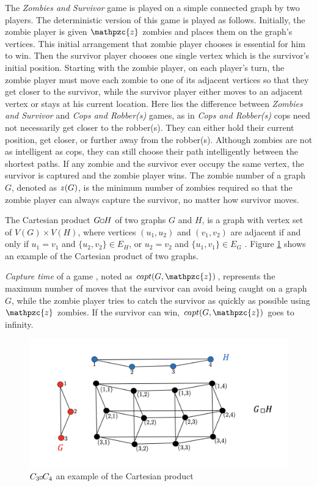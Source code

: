 \documentclass[1p]{elsarticle}
\newcommand{\zn}{\ooalign{$z$\cr\hfil\rule[.5ex]{.2em}{.08ex}\hfil\cr}}
\newcommand{\sq}[1][black]{%
\begin{tikzpicture}                                                           
  \draw[#1] (2pt,0pt) -- (6pt,0pt);   
  \draw[#1] (2pt,0pt) -- (2pt,4pt);    
  \draw[#1] (2pt,4pt) -- (6pt,4pt);   
  \draw[#1] (6pt,0pt) -- (6pt,4pt);
\end{tikzpicture}%
}
\newcommand{\sqSmall}[1][black]{%
\begin{tikzpicture}                                                           
  \draw[#1] (1.5pt,0pt) -- (4.5pt,0pt);   
  \draw[#1] (1.5pt,0pt) -- (1.5pt,3pt);    
  \draw[#1] (1.5pt,3pt) -- (4.5pt,3pt);   
  \draw[#1] (4.5pt,0pt) -- (4.5pt,3pt);
\end{tikzpicture}%
}
\begin{document}
The {\it Zombies and Survivor} game is played on a simple connected graph by two players. The deterministic version of
this game \cite{Fitz16} is played as follows. Initially, the zombie player is given $\mathpzc{z}$ zombies and places
them on the graph's vertices. This initial arrangement that zombie player chooses is essential for him to win.  Then the
survivor player chooses one single vertex which is the survivor's initial position. Starting with the zombie player, on
each player's turn, the zombie player must move each zombie to one of its adjacent vertices so that they get closer to
the survivor, while the survivor player either moves to an adjacent vertex or stays at his current location. Here lies
the difference between {\it Zombies and Survivor} and {\it Cops and Robber(s)} games, as in {\it Cops and Robber(s)}
cops need not necessarily get closer to the robber(s). They can either hold their current position, get closer, or
further away from the robber(s). Although zombies are not as intelligent as cops, they can still choose their path
intelligently between the shortest paths. If any zombie and the survivor ever occupy the same vertex, the survivor is
captured and the zombie player wins. The zombie number of a graph $G$, denoted as $\zn(G)$, is the minimum number of
zombies required so that the zombie player can always capture the survivor, no matter how survivor moves.

The Cartesian product $G \sq H$ of two graphs $G$ and $H$, is a graph with vertex set of $V(G) \times V(H)$, where
vertices $(u_1 , u_2)$ and $(v_1 , v_2)$ are adjacent if and only if $u_1 = v_1$ and $ \{ u_2 , v_2 \} \in E_{H} $, or
$u_2 = v_2$ and $ \{u_1 , v_1 \} \in E_{G}$ \cite{West02}. Figure \ref{fig:p2} shows an example of the Cartesian product
of two graphs.

{\it Capture time} of a game \cite{Bonato09}, noted as $capt(G,\mathpzc{z})$, represents the maximum number of moves
that the survivor can avoid being caught on a graph $G$, while the zombie player tries to catch the survivor as quickly
as possible using $\mathpzc{z}$ zombies. If the survivor can win, $capt(G,\mathpzc{z})$ goes to infinity.

\begin{figure}[h!]
	\centering
	\includegraphics[width=0.9\linewidth]{fig/CpWest.png}
	\caption{$C_3 \sqSmall C_4$ an example of the Cartesian product}
	\label{fig:p2}
\end{figure}
\end{document}
